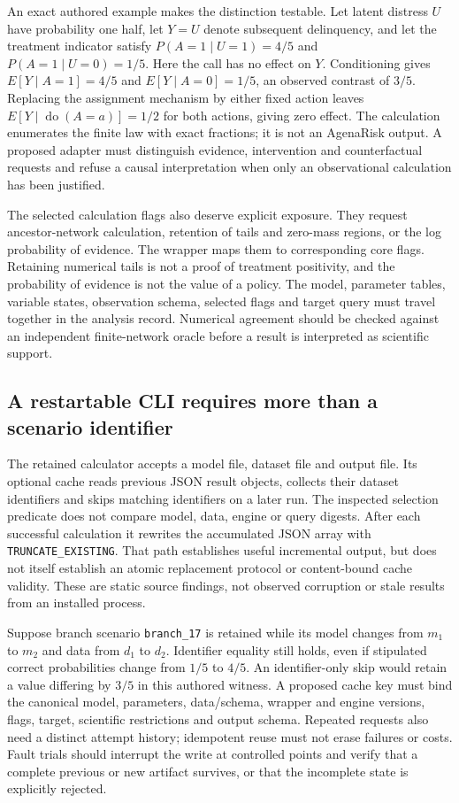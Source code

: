 An exact authored example makes the distinction testable. Let latent distress
$U$ have probability one half, let $Y=U$ denote subsequent delinquency, and
let the treatment indicator satisfy $P(A=1\mid U=1)=4/5$ and
$P(A=1\mid U=0)=1/5$. Here the call has no effect on $Y$. Conditioning gives
$E[Y\mid A=1]=4/5$ and $E[Y\mid A=0]=1/5$, an observed contrast of $3/5$.
Replacing the assignment mechanism by either fixed action leaves
$E[Y\mid\operatorname{do}(A=a)]=1/2$ for both actions, giving zero effect.
The calculation enumerates the finite law with exact fractions; it is not
an AgenaRisk output. A proposed adapter must distinguish evidence, intervention
and counterfactual requests and refuse a causal interpretation when only an
observational calculation has been justified.\citep{exec25_agena_choice}

The selected calculation flags also deserve explicit exposure. They request
ancestor-network calculation, retention of tails and zero-mass regions, or
the log probability of evidence. The wrapper maps them to corresponding core
flags. Retaining numerical tails is not a proof of treatment positivity, and
the probability of evidence is not the value of a policy. The model, parameter
tables, variable states, observation schema, selected flags and target query
must travel together in the analysis record. Numerical agreement should be
checked against an independent finite-network oracle before a result is
interpreted as scientific support.\citep{exec25_agena_source,exec25_agena_choice}

\subsection{A restartable CLI requires more than a scenario identifier}
The retained calculator accepts a model file, dataset file and output file.
Its optional cache reads previous JSON result objects, collects their dataset
identifiers and skips matching identifiers on a later run. The inspected
selection predicate does not compare model, data, engine or query digests.
After each successful calculation it rewrites the accumulated JSON array with
\texttt{TRUNCATE\_EXISTING}. That path establishes useful incremental output,
but does not itself establish an atomic replacement protocol or content-bound
cache validity. These are static source findings, not observed corruption or
stale results from an installed process.\citep{exec25_agena_source}

Suppose branch scenario \texttt{branch\_17} is retained while its model changes
from $m_1$ to $m_2$ and data from $d_1$ to $d_2$. Identifier equality still holds,
even if stipulated correct probabilities change from $1/5$ to $4/5$. An
identifier-only skip would retain a value differing by $3/5$ in this authored
witness. A proposed cache key must bind the canonical model, parameters,
data/schema, wrapper and engine versions, flags, target, scientific restrictions
and output schema. Repeated requests also need a distinct attempt history;
idempotent reuse must not erase failures or costs. Fault trials should interrupt
the write at controlled points and verify that a complete previous or new
artifact survives, or that the incomplete state is explicitly rejected.
\citep{exec25_agena_choice}

